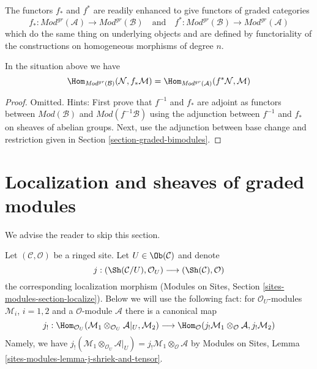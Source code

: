 \medskip\noindent
The functors $f_*$ and $f^*$ are readily enhanced to give
functors of graded categories
$$
f_* :
\textit{Mod}^{gr}(\mathcal{A})
\longrightarrow
\textit{Mod}^{gr}(\mathcal{B})
\quad\text{and}\quad
f^* :
\textit{Mod}^{gr}(\mathcal{B})
\longrightarrow
\textit{Mod}^{gr}(\mathcal{A})
$$
which do the same thing on underlying objects and are defined
by functoriality of the constructions on homogeneous morphisms
of degree $n$.

\begin{lemma}
\label{lemma-adjunction-push-pull-gr}
In the situation above we have
$$
\Hom_{\textit{Mod}^{gr}(\mathcal{B})}(
\mathcal{N}, f_*\mathcal{M}) =
\Hom_{\textit{Mod}^{gr}(\mathcal{A})}(
f^*\mathcal{N}, \mathcal{M})
$$
\end{lemma}

\begin{proof}
Omitted. Hints: First prove that $f^{-1}$ and $f_*$ are adjoint
as functors between $\textit{Mod}(\mathcal{B})$ and
$\textit{Mod}(f^{-1}\mathcal{B})$ using the adjunction between
$f^{-1}$ and $f_*$ on sheaves of abelian groups.
Next, use the adjunction between base change and restriction
given in Section \ref{section-graded-bimodules}.
\end{proof}





\section{Localization and sheaves of graded modules}
\label{section-localize-graded}

\noindent
We advise the reader to skip this section.

\medskip\noindent
Let $(\mathcal{C}, \mathcal{O})$ be a ringed site.
Let $U \in \Ob(\mathcal{C})$ and denote
$$
j :
(\Sh(\mathcal{C}/U), \mathcal{O}_U)
\longrightarrow
(\Sh(\mathcal{C}), \mathcal{O})
$$
the corresponding localization morphism
(Modules on Sites, Section \ref{sites-modules-section-localize}).
Below we will use the following fact: for $\mathcal{O}_U$-modules
$\mathcal{M}_i$, $i = 1, 2$ and a $\mathcal{O}$-module $\mathcal{A}$
there is a canonical map
$$
j_! :
\Hom_{\mathcal{O}_U}(
\mathcal{M}_1 \otimes_{\mathcal{O}_U} \mathcal{A}|_U, \mathcal{M}_2)
\longrightarrow
\Hom_\mathcal{O}(
j_!\mathcal{M}_1 \otimes_\mathcal{O} \mathcal{A}, j_!\mathcal{M}_2)
$$
Namely, we have
$j_!(\mathcal{M}_1 \otimes_{\mathcal{O}_U} \mathcal{A}|_U) =
j_!\mathcal{M}_1 \otimes_\mathcal{O} \mathcal{A}$ by
Modules on Sites, Lemma \ref{sites-modules-lemma-j-shriek-and-tensor}.

